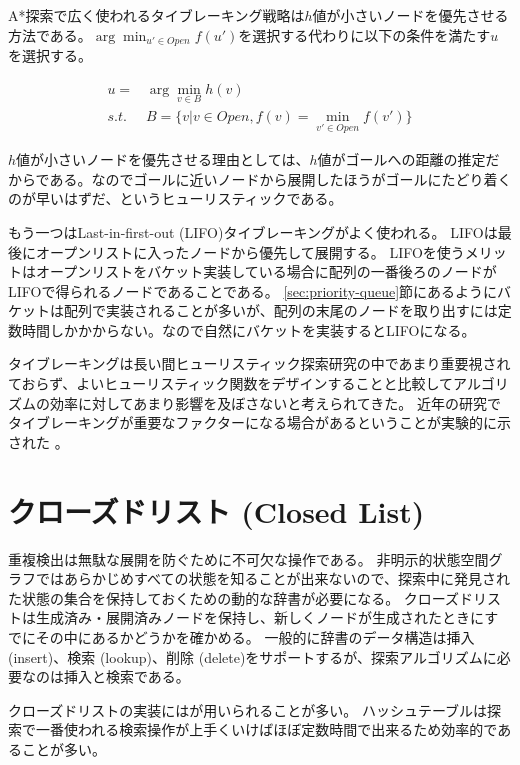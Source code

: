 A*探索で広く使われるタイブレーキング戦略は$h$値が小さいノードを優先させる方法である。$\arg \min_{u' \in Open} f(u')$を選択する代わりに以下の条件を満たす$u$を選択する。

\begin{align*}
  u =& \arg \min_{v \in B} h(v) \\
  s.t. \; \; & B = \{v | v \in Open, f(v) = \min_{v' \in Open} f(v')\}
\end{align*}

$h$値が小さいノードを優先させる理由としては、$h$値がゴールへの距離の推定だからである。なのでゴールに近いノードから展開したほうがゴールにたどり着くのが早いはずだ、というヒューリスティックである。

もう一つはLast-in-first-out (LIFO)タイブレーキングがよく使われる。
LIFOは最後にオープンリストに入ったノードから優先して展開する。
LIFOを使うメリットはオープンリストをバケット実装している場合に配列の一番後ろのノードがLIFOで得られるノードであることである。
\ref{sec:priority-queue}節にあるようにバケットは配列で実装されることが多いが、配列の末尾のノードを取り出すには定数時間しかかからない。なので自然にバケットを実装するとLIFOになる。


タイブレーキングは長い間ヒューリスティック探索研究の中であまり重要視されておらず、よいヒューリスティック関数をデザインすることと比較してアルゴリズムの効率に対してあまり影響を及ぼさないと考えられてきた。
近年の研究でタイブレーキングが重要なファクターになる場合があるということが実験的に示された \cite{asai2016tiebreaking}。


\section{クローズドリスト (Closed List)}
\label{sec:closed-list}

重複検出は無駄な展開を防ぐために不可欠な操作である。
非明示的状態空間グラフではあらかじめすべての状態を知ることが出来ないので、探索中に発見された状態の集合を保持しておくための動的な辞書が必要になる。
クローズドリストは生成済み・展開済みノードを保持し、新しくノードが生成されたときにすでにその中にあるかどうかを確かめる。
一般的に辞書のデータ構造は挿入 (insert)、検索 (lookup)、削除 (delete)をサポートするが、探索アルゴリズムに必要なのは挿入と検索である。

クローズドリストの実装にはが用いられることが多い。
ハッシュテーブルは探索で一番使われる検索操作が上手くいけばほぼ定数時間で出来るため効率的であることが多い。


